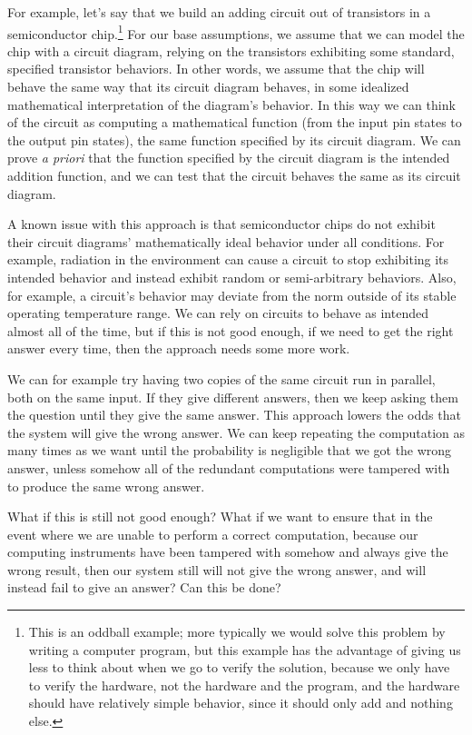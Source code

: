 \documentclass[11pt]{article}
\begin{document}
For example, let's say that we build an adding circuit out of transistors in a
semiconductor chip.\footnote{This is an oddball example; more typically we would solve this
problem by writing a computer program, but this example has the advantage of giving
us less to think about when we go to verify the solution, because we only have
to verify the hardware, not the hardware and the program, and the hardware should
have relatively simple behavior, since it should only add and nothing else.}
For our base assumptions, we assume that we can model the chip with a circuit diagram,
relying on the transistors exhibiting some standard, specified transistor behaviors.
In other words, we assume that the chip will behave the same way that its circuit diagram
behaves, in some idealized mathematical interpretation of the diagram's behavior.
In this way we can think of the circuit as computing a mathematical function (from
the input pin states to the output pin states), the same function specified by its
circuit diagram. We can prove \emph{a priori}\/ that the function specified by the
circuit diagram is the intended addition function, and we can test that
the circuit behaves the same as its circuit diagram.

A known issue with this approach is that semiconductor chips do not exhibit
their circuit diagrams' mathematically ideal behavior under all conditions. For
example, radiation in the environment can cause a circuit to stop exhibiting
its intended behavior and instead exhibit random or semi-arbitrary behaviors.
Also, for example, a circuit's behavior may deviate from the norm outside of its
stable operating temperature range. We can rely on circuits to behave as intended
almost all of the time, but if this is not good enough, if we need to get the
right answer every time, then the approach needs some more work.

We can for example try having two copies of the same circuit run in parallel,
both on the same input. If they give different answers, then we keep asking
them the question until they give the same answer. This approach lowers the
odds that the system will give the wrong answer. We can keep repeating the
computation as many times as we want until the probability is negligible that
we got the wrong answer, unless somehow all of the redundant computations
were tampered with to produce the same wrong answer.

What if this is still not good enough? What if we want to ensure that in the event
where we are unable to perform a correct computation, because our computing
instruments have been tampered with somehow and always give the wrong result,
then our system still will not give the wrong answer, and will instead fail
to give an answer? Can this be done?
\end{document}
